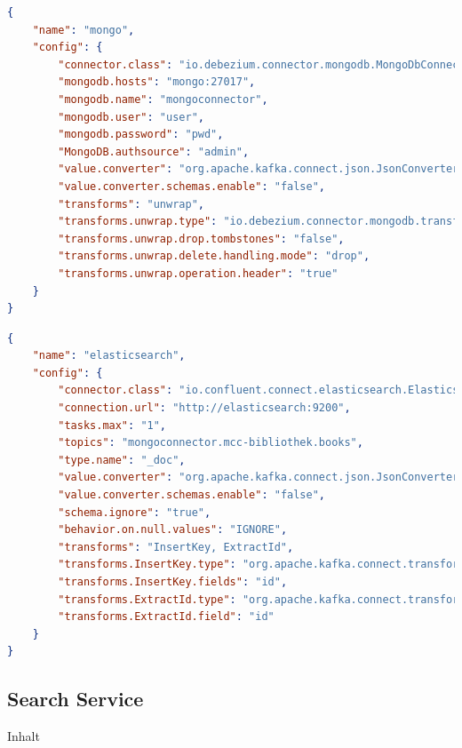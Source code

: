 
\begin{lstlisting}[language=json,firstnumber=1]
{
    "name": "mongo",
    "config": {
        "connector.class": "io.debezium.connector.mongodb.MongoDbConnector",
        "mongodb.hosts": "mongo:27017",
        "mongodb.name": "mongoconnector",
        "mongodb.user": "user",
        "mongodb.password": "pwd",
        "MongoDB.authsource": "admin",
        "value.converter": "org.apache.kafka.connect.json.JsonConverter",
        "value.converter.schemas.enable": "false",
        "transforms": "unwrap",
        "transforms.unwrap.type": "io.debezium.connector.mongodb.transforms.ExtractNewDocumentState",
        "transforms.unwrap.drop.tombstones": "false",
        "transforms.unwrap.delete.handling.mode": "drop",
        "transforms.unwrap.operation.header": "true"
    }
}
\end{lstlisting}

\begin{lstlisting}[language=json,firstnumber=1]
{
    "name": "elasticsearch",
    "config": {
        "connector.class": "io.confluent.connect.elasticsearch.ElasticsearchSinkConnector",
        "connection.url": "http://elasticsearch:9200",
        "tasks.max": "1",
        "topics": "mongoconnector.mcc-bibliothek.books",
        "type.name": "_doc",
        "value.converter": "org.apache.kafka.connect.json.JsonConverter",
        "value.converter.schemas.enable": "false",
        "schema.ignore": "true",
        "behavior.on.null.values": "IGNORE",
        "transforms": "InsertKey, ExtractId",
        "transforms.InsertKey.type": "org.apache.kafka.connect.transforms.ValueToKey",
        "transforms.InsertKey.fields": "id",
        "transforms.ExtractId.type": "org.apache.kafka.connect.transforms.ExtractField$Key",
        "transforms.ExtractId.field": "id"
    }
}
\end{lstlisting}

\subsection{Search Service\label{sec5.2.3:Unterunterpunkt-3}}

Inhalt

